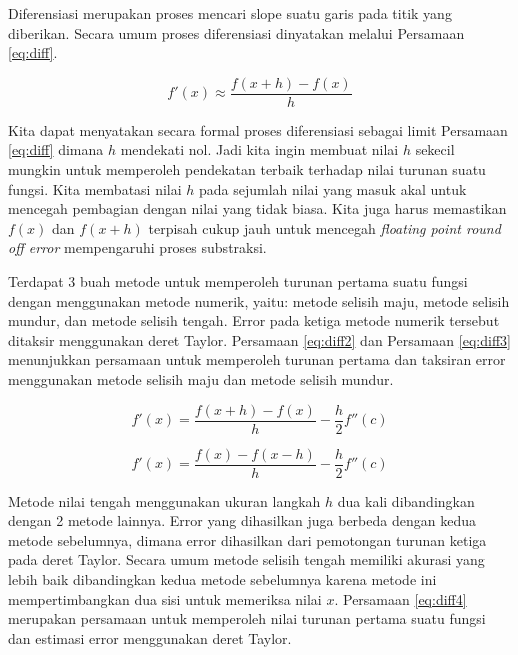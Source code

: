 \documentclass[
]{book}
\theoremstyle{definition}
\theoremstyle{definition}
\theoremstyle{definition}
\theoremstyle{definition}
\theoremstyle{remark}
\begin{document}
Diferensiasi merupakan proses mencari slope suatu garis pada titik yang diberikan. Secara umum proses diferensiasi dinyatakan melalui Persamaan \eqref{eq:diff}.

\begin{equation}
f'\left(x\right) \approx \frac{f\left(x+h\right)-f\left(x\right)}{h}
  \label{eq:diff}
\end{equation}

Kita dapat menyatakan secara formal proses diferensiasi sebagai limit Persamaan \eqref{eq:diff} dimana \(h\) mendekati nol. Jadi kita ingin membuat nilai \(h\) sekecil mungkin untuk memperoleh pendekatan terbaik terhadap nilai turunan suatu fungsi. Kita membatasi nilai \(h\) pada sejumlah nilai yang masuk akal untuk mencegah pembagian dengan nilai yang tidak biasa. Kita juga harus memastikan \(f\left(x\right)\) dan \(f\left(x+h\right)\) terpisah cukup jauh untuk mencegah \emph{floating point round off error} mempengaruhi proses substraksi.

Terdapat 3 buah metode untuk memperoleh turunan pertama suatu fungsi dengan menggunakan metode numerik, yaitu: metode selisih maju, metode selisih mundur, dan metode selisih tengah. Error pada ketiga metode numerik tersebut ditaksir menggunakan deret Taylor. Persamaan \eqref{eq:diff2} dan Persamaan \eqref{eq:diff3} menunjukkan persamaan untuk memperoleh turunan pertama dan taksiran error menggunakan metode selisih maju dan metode selisih mundur.

\begin{equation}
f'\left(x\right) = \frac{f\left(x+h\right)-f\left(x\right)}{h} - \frac{h}{2} f''\left(c\right)
  \label{eq:diff2}
\end{equation}

\begin{equation}
f'\left(x\right) = \frac{f\left(x\right)-f\left(x-h\right)}{h} - \frac{h}{2} f''\left(c\right)
  \label{eq:diff3}
\end{equation}

Metode nilai tengah menggunakan ukuran langkah \(h\) dua kali dibandingkan dengan 2 metode lainnya. Error yang dihasilkan juga berbeda dengan kedua metode sebelumnya, dimana error dihasilkan dari pemotongan turunan ketiga pada deret Taylor. Secara umum metode selisih tengah memiliki akurasi yang lebih baik dibandingkan kedua metode sebelumnya karena metode ini mempertimbangkan dua sisi untuk memeriksa nilai \(x\). Persamaan \eqref{eq:diff4} merupakan persamaan untuk memperoleh nilai turunan pertama suatu fungsi dan estimasi error menggunakan deret Taylor.
\end{document}
